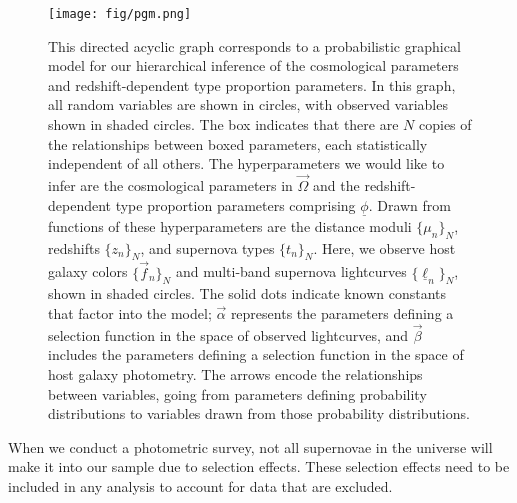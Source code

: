 \documentclass[12pt, twocolumn]{emulateapj}
\newcommand{\textul}{\underline}
\newcommand{\scippr}{\texttt{scippr}~}
\newcommand{\tkAM}[1]{\textcolor{green}{#1}}  %
\begin{document}
\begin{figure}
\begin{center}
\texttt{[image: fig/pgm.png]}
\caption{This directed acyclic graph corresponds to a probabilistic graphical model for our hierarchical inference of the cosmological parameters and redshift-dependent type proportion parameters.  
In this graph, all random variables are shown in circles, with observed variables shown in shaded circles. 
The box indicates that there are $N$ copies of the relationships between boxed parameters, each statistically independent of all others.  
The hyperparameters we would like to infer are the cosmological parameters in $\vec{\Omega}$ and the redshift-dependent type proportion parameters comprising $\textul{\phi}$.  
Drawn from functions of these hyperparameters are the distance moduli $\{\mu_{n}\}_{N}$, redshifts $\{z_{n}\}_{N}$, and supernova types $\{t_{n}\}_{N}$.  
Here, we observe host galaxy colors $\{\vec{f}_{n}\}_{N}$ and multi-band supernova lightcurves $\{\textul{\ell}_{n}\}_{N}$, shown in shaded circles.  
The solid dots indicate known constants that factor into the model; $\vec{\alpha}$ represents the parameters defining a selection function in the space of observed lightcurves, and $\vec{\beta}$ includes the parameters defining a selection function in the space of host galaxy photometry.  
The arrows encode the relationships between variables, going from parameters defining probability distributions to variables drawn from those probability distributions.}
\label{fig:pgm}
\end{center}
\end{figure}


When we conduct a photometric survey, not all supernovae in the universe will make it into our sample due to selection effects. 
These selection effects need to be included in any analysis to account for data that are excluded.
\end{document}
